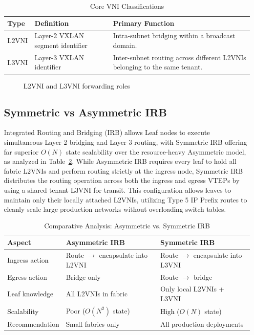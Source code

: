 \begin{table}[!htbp]
    \centering
    \begin{tabularx}{\textwidth}{l l X}
        \toprule
        \textbf{Type} & \textbf{Definition} & \textbf{Primary Function} \\
        \midrule
        L2VNI & Layer-2 VXLAN segment identifier & Intra-subnet bridging within a broadcast domain. \\
        \midrule
        L3VNI & Layer-3 VXLAN identifier & Inter-subnet routing across different L2VNIs belonging to the same tenant. \\
        \bottomrule
    \end{tabularx}
    \caption{Core VNI Classifications}
    \label{tab:vni_types}
\end{table}

\begin{figure}[!htbp]
        \centering
        \LVNILVNI
        \caption{ L2VNI and L3VNI forwarding roles}
        \label{fig:LVNILVNI}
\end{figure}

\subsection*{Symmetric vs Asymmetric IRB}
Integrated Routing and Bridging (IRB) allows Leaf nodes to execute simultaneous Layer 2 bridging and Layer 3 routing, with Symmetric IRB offering far superior $O(N)$ state scalability over the resource-heavy Asymmetric model, as analyzed in Table~\ref{tab:irb_comparison}. While Asymmetric IRB requires every leaf to hold all fabric L2VNIs and perform routing strictly at the ingress node, Symmetric IRB distributes the routing operation across both the ingress and egress VTEPs by using a shared tenant L3VNI for transit. This configuration allows leaves to maintain only their locally attached L2VNIs, utilizing Type 5 IP Prefix routes to cleanly scale large production networks without overloading switch tables\cite{IETFRFC8365,VXLAN_Network_with_MP-BGP_EVPN_Control_Plane_Design_Guide}.

\begin{table}[!htbp]
    \centering
    \begin{tabularx}{\textwidth}{l X X}
        \toprule
        \textbf{Aspect} & \textbf{Asymmetric IRB} & \textbf{Symmetric IRB} \\
        \midrule
        Ingress action & Route $\rightarrow$ encapsulate into L2VNI & Route $\rightarrow$ encapsulate into L3VNI \\
        Egress action & Bridge only & Route $\rightarrow$ bridge \\
        Leaf knowledge & All L2VNIs in fabric & Only local L2VNIs + L3VNI \\
        Scalability & Poor ($O(N^2)$ state) & High ($O(N)$ state) \\
        Recommendation & Small fabrics only & All production deployments \\
        \bottomrule
    \end{tabularx}
    \caption{Comparative Analysis: Asymmetric vs. Symmetric IRB}
    \label{tab:irb_comparison}
\end{table}

